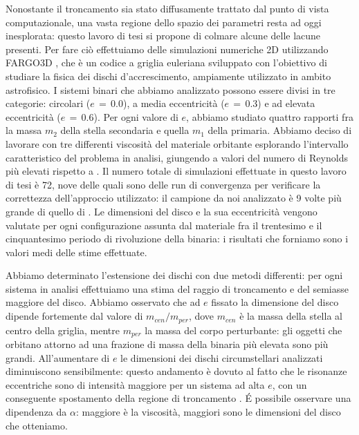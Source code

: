 \documentclass[12pt, a4paper]{report}
\begin{document}
Nonostante il troncamento sia stato diffusamente trattato dal punto di vista computazionale, una vasta regione dello spazio dei parametri resta ad oggi inesplorata: questo lavoro di tesi si propone di colmare alcune delle lacune presenti. 
Per fare ciò effettuiamo delle simulazioni numeriche 2D utilizzando FARGO3D \parencite{Fargo3D}, che è un codice a griglia euleriana sviluppato con l'obiettivo di studiare la fisica dei dischi d'accrescimento, ampiamente utilizzato in ambito astrofisico.
I sistemi binari che abbiamo analizzato possono essere divisi in tre categorie: circolari ($e\,=\,0.0$), a media eccentricità ($e\,=\,0.3$) e ad elevata eccentricità ($e\,=\,0.6$).
Per ogni valore di $e$, abbiamo studiato quattro rapporti fra la massa $m_2$ della stella secondaria e quella $m_1$ della primaria.
Abbiamo deciso di lavorare con tre differenti viscosità del materiale orbitante esplorando l'intervallo caratteristico del problema in analisi, giungendo a valori del numero di Reynolds più elevati rispetto a \textcite{ArtymowiczLubow1994}.
Il numero totale di simulazioni effettuate in questo lavoro di tesi è 72, nove delle quali sono delle run di convergenza per verificare la correttezza dell'approccio utilizzato: il campione da noi analizzato è 9 volte più grande di quello di \textcite{ArtymowiczLubow1994}.
Le dimensioni del disco e la sua eccentricità vengono valutate per ogni configurazione assunta dal materiale fra il trentesimo e il cinquantesimo periodo di rivoluzione della binaria: i risultati che forniamo sono i valori medi delle stime effettuate.

Abbiamo determinato l'estensione dei dischi con due metodi differenti: per ogni sistema in analisi effettuiamo una stima del raggio di troncamento e del semiasse maggiore del disco. 
Abbiamo osservato che ad $e$ fissato la dimensione del disco dipende fortemente dal valore di $m_{cen}/m_{per}$, dove $m_{cen}$ è la massa della stella al centro della griglia, mentre $m_{per}$ la massa del corpo perturbante: gli oggetti che orbitano attorno ad una frazione di massa della binaria più elevata sono più grandi.
All'aumentare di $e$ le dimensioni dei dischi circumstellari analizzati diminuiscono sensibilmente: questo andamento è dovuto al fatto che le risonanze eccentriche sono di intensità maggiore per un sistema ad alta $e$, con un conseguente spostamento della regione di troncamento \parencite{ArtymowiczLubow1994}.
\'E possibile osservare una dipendenza da $\alpha$: maggiore è la viscosità, maggiori sono le dimensioni del disco che otteniamo.
\end{document}
